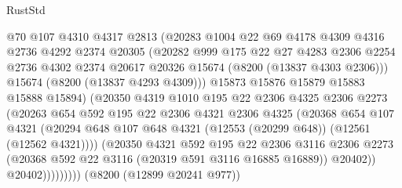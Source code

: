 \begin{lexlean}{RustStd}
\begin{coremodule}
                      @70
                      @107
                      @4310
                      @4317
                      @2813
                      (@20283
                        @1004
                        @22
                        @69
                        @4178
                        @4309
                        @4316
                        @2736
                        @4292
                        @2374
                        @20305
                        (@20282
                          @999
                          @175
                          @22
                          @27
                          @4283
                          @2306
                          @2254
                          @2736
                          @4302
                          @2374
                          @20617
                          @20326
                          @15674
                          (@8200 (@13837 @4303 @2306)))
                        @15674
                        (@8200 (@13837 @4293 @4309)))
                      @15873
                      @15876
                      @15879
                      @15883
                      @15888
                      @15894)
                    (@20350
                      @4319
                      @1010
                      @195
                      @22
                      @2306
                      @4325
                      @2306
                      @2273
                      (@20263
                        @654
                        @592
                        @195
                        @22
                        @2306
                        @4321
                        @2306
                        @4325
                        (@20368
                          @654
                          @107
                          @4321
                          (@20294
                            @648
                            @107
                            @648
                            @4321
                            (@12553 (@20299 @648))
                            (@12561 (@12562 @4321))))
                        (@20350
                          @4321
                          @592
                          @195
                          @22
                          @2306
                          @3116
                          @2306
                          @2273
                          (@20368 @592 @22 @3116 (@20319 @591 @3116 @16885 @16889))
                          @20402))
                      @20402)))))))))
    (@8200 (@12899 @20241 @977))

\end{coremodule}
\end{lexlean}
